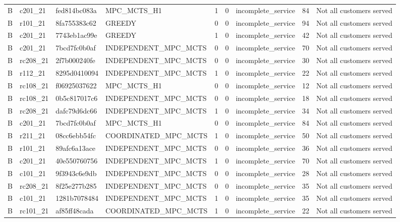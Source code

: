 \begin{table}
{\begin{tabular}{llllrrlrl}
B & c201\_21 & fed814bc083a & MPC\_MCTS\_H1 & 1 & 0 & incomplete\_service & 84 & Not all customers served \\
B & r101\_21 & 8fa755383c62 & GREEDY & 0 & 0 & incomplete\_service & 94 & Not all customers served \\
B & c201\_21 & 7743eb1ac99e & GREEDY & 1 & 0 & incomplete\_service & 42 & Not all customers served \\
B & c201\_21 & 7bcd7fc0b0af & INDEPENDENT\_MPC\_MCTS & 0 & 0 & incomplete\_service & 70 & Not all customers served \\
B & rc208\_21 & 2f7b000240fe & INDEPENDENT\_MPC\_MCTS & 0 & 0 & incomplete\_service & 30 & Not all customers served \\
B & r112\_21 & 8295d0410094 & INDEPENDENT\_MPC\_MCTS & 1 & 0 & incomplete\_service & 22 & Not all customers served \\
B & rc108\_21 & f06925037622 & MPC\_MCTS\_H1 & 0 & 0 & incomplete\_service & 12 & Not all customers served \\
B & rc108\_21 & 0b5c817017c6 & INDEPENDENT\_MPC\_MCTS & 0 & 0 & incomplete\_service & 18 & Not all customers served \\
B & rc208\_21 & dafc79d6dc66 & INDEPENDENT\_MPC\_MCTS & 1 & 0 & incomplete\_service & 34 & Not all customers served \\
B & c201\_21 & 7bcd7fc0b0af & MPC\_MCTS\_H1 & 0 & 0 & incomplete\_service & 84 & Not all customers served \\
B & r211\_21 & 08cc6ebb54fc & COORDINATED\_MPC\_MCTS & 1 & 0 & incomplete\_service & 50 & Not all customers served \\
B & r101\_21 & 89afc6a13ace & INDEPENDENT\_MPC\_MCTS & 0 & 0 & incomplete\_service & 36 & Not all customers served \\
B & c201\_21 & 40e550760756 & INDEPENDENT\_MPC\_MCTS & 1 & 0 & incomplete\_service & 70 & Not all customers served \\
B & c101\_21 & 9f3943c6e9db & INDEPENDENT\_MPC\_MCTS & 0 & 0 & incomplete\_service & 28 & Not all customers served \\
B & rc208\_21 & 8f25e277b285 & INDEPENDENT\_MPC\_MCTS & 0 & 0 & incomplete\_service & 35 & Not all customers served \\
B & c101\_21 & 1281b7078484 & INDEPENDENT\_MPC\_MCTS & 1 & 0 & incomplete\_service & 35 & Not all customers served \\
B & rc101\_21 & af85ff48cada & COORDINATED\_MPC\_MCTS & 1 & 0 & incomplete\_service & 22 & Not all customers served \\

\end{tabular}}
\end{table}
